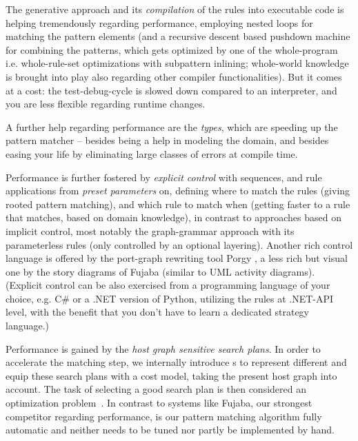 The generative approach and its \emph{compilation} of the rules into executable code is helping tremendously regarding performance, employing nested loops for matching the pattern elements (and a recursive descent based pushdown machine for combining the patterns, which gets optimized by one of the whole-program i.e. whole-rule-set optimizations with subpattern inlining; whole-world knowledge is brought into play also regarding other compiler functionalities).
But it comes at a cost: the test-debug-cycle is slowed down compared to an interpreter, and you are less flexible regarding runtime changes.

A further help regarding performance are the \emph{types}, which are speeding up the pattern matcher
-- besides being a help in modeling the domain, and besides easing your life by eliminating large classes of errors at compile time.

Performance is further fostered by \emph{explicit control} with sequences, and rule applications from \emph{preset parameters} on, defining where to match the rules (giving rooted pattern matching), and which rule to match when (getting faster to a rule that matches, based on domain knowledge), in contrast to approaches based on implicit control, most notably the graph-grammar approach with its parameterless rules (only controlled by an optional layering).
Another rich control language is offered by the port-graph rewriting tool Porgy \cite{porgy}, a less rich but visual one by the story diagrams \cite{storydiagrams} of Fujaba (similar to UML activity diagrams).
(Explicit control can be also exercised from a programming language of your choice, e.g. C\# \cite{csharp} or a .NET version of Python\cite{python}, utilizing the rules at .NET-API level, with the benefit that you don't have to learn a dedicated strategy language.)

Performance is gained by the \emph{host graph sensitive search plans}.
In order to accelerate the matching step, we internally introduce s
to represent different  and equip these search plans with a cost model, taking the present host graph into account.
The task of selecting a good search plan is then considered an optimization problem~\cite{BKG:07,Bat:06}.
In contrast to systems like Fujaba\cite{fujaba,fuj}, our strongest competitor regarding performance,
is our pattern matching algorithm fully automatic and neither needs to be tuned nor partly be implemented by hand.

